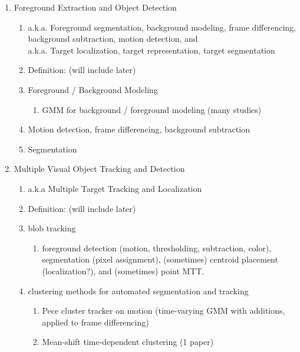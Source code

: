 \documentclass{article}
\begin{document}
\begin{enumerate}
\item Foreground Extraction and Object Detection
	\begin{enumerate}
	\item a.k.a. Foreground segmentation, background modeling, frame differencing, background subtraction, motion detection, and \\
	a.k.a. Target localization, target representation, target segmentation 
	\item Definition: (will include later)
	\item Foreground / Background Modeling
		\begin{enumerate}
		\item GMM for background / foreground modeling (many studies)
		\end{enumerate}
	\item Motion detection, frame differencing, background subtraction
	\item Segmentation
	\end{enumerate}
\item Multiple Visual Object Tracking and Detection
	\begin{enumerate}
	\item a.k.a Multiple Target Tracking and Localization
	\item Definition: (will include later) 
	\item blob tracking
		\begin{enumerate}
		\item foreground detection (motion, thresholding, subtraction, color), segmentation (pixel assignment), (sometimes) centroid placement (localization?), and (sometimes) point MTT.
		\end{enumerate}
	\item clustering methods for automated segmentation and tracking
		\begin{enumerate}
		\item Pece cluster tracker on motion (time-varying GMM with additions, applied to frame differencing)
		\item Mean-shift time-dependent clustering (1 paper)
		\end{enumerate}
	\end{enumerate}
\end{enumerate}
\end{document}
